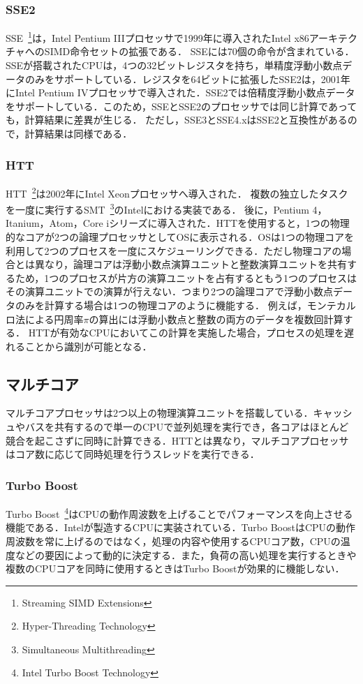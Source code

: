 \subsubsection{SSE2}
SSE~\footnote{Streaming SIMD Extensions}は，Intel Pentium IIIプロセッサで1999年に導入されたIntel x86アーキテクチャへのSIMD命令セットの拡張である． SSEには70個の命令が含まれている．SSEが搭載されたCPUは，4つの32ビットレジスタを持ち，単精度浮動小数点データのみをサポートしている．レジスタを64ビットに拡張したSSE2は，2001年にIntel Pentium IVプロセッサで導入された．SSE2では倍精度浮動小数点データをサポートしている．このため，SSEとSSE2のプロセッサでは同じ計算であっても，計算結果に差異が生じる．
ただし，SSE3とSSE4.xはSSE2と互換性があるので，計算結果は同様である．
\subsubsection{HTT}
HTT~\footnote{Hyper-Threading Technology}は2002年にIntel Xeonプロセッサへ導入された．
複数の独立したタスクを一度に実行するSMT~\footnote{Simultaneous Multithreading}のIntelにおける実装である．
後に，Pentium 4，Itanium，Atom，Core iシリーズに導入された．HTTを使用すると，1つの物理的なコアが2つの論理プロセッサとしてOSに表示される．OSは1つの物理コアを利用して2つのプロセスを一度にスケジューリングできる．ただし物理コアの場合とは異なり，論理コアは浮動小数点演算ユニットと整数演算ユニットを共有するため，1つのプロセスが片方の演算ユニットを占有するともう1つのプロセスはその演算ユニットでの演算が行えない．つまり2つの論理コアで浮動小数点データのみを計算する場合は1つの物理コアのように機能する．
例えば，モンテカルロ法による円周率$\pi$の算出には浮動小数点と整数の両方のデータを複数回計算する．
HTTが有効なCPUにおいてこの計算を実施した場合，プロセスの処理を遅れることから識別が可能となる．
\subsection{マルチコア}
マルチコアプロセッサは2つ以上の物理演算ユニットを搭載している．キャッシュやバスを共有するので単一のCPUで並列処理を実行でき，各コアはほとんど競合を起こさずに同時に計算できる．HTTとは異なり，マルチコアプロセッサはコア数に応じて同時処理を行うスレッドを実行できる．
\subsubsection{Turbo Boost}
Turbo Boost~\footnote{Intel Turbo Boost Technology}はCPUの動作周波数を上げることでパフォーマンスを向上させる機能である．Intelが製造するCPUに実装されている．Turbo BoostはCPUの動作周波数を常に上げるのではなく，処理の内容や使用するCPUコア数，CPUの温度などの要因によって動的に決定する．また，負荷の高い処理を実行するときや複数のCPUコアを同時に使用するときはTurbo Boostが効果的に機能しない．

